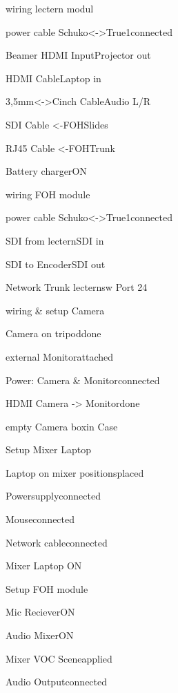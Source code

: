 \begin{checklist}{wiring lectern modul}
  \item{power cable Schuko<->True1}{connected}
  \item{Beamer HDMI Input}{Projector out}
  \item{HDMI Cable}{Laptop in}
  \item{3,5mm<->Cinch Cable}{Audio L/R}
  \item{SDI Cable <-FOH}{Slides}
  \item{RJ45 Cable <-FOH}{Trunk}
  \item{Battery charger}{ON}
\end{checklist}

\begin{checklist}{wiring FOH module}
  \item{power cable Schuko<->True1}{connected}
  \item{SDI from lectern}{SDI in}
  \item{SDI to Encoder}{SDI out}
  \item{Network Trunk lectern}{sw Port 24}
\end{checklist}

\begin{checklist}{wiring \& setup Camera}
  \item{Camera on tripod}{done}
  \item{external Monitor}{attached}
  \item{Power: Camera \& Monitor}{connected}
  \item{HDMI Camera -> Monitor}{done}
  \item{empty Camera box}{in Case}
\end{checklist}

\begin{checklist}{Setup Mixer Laptop}
  \item{Laptop on mixer positions}{placed}
  \item{Powersupply}{connected}
  \item{Mouse}{connected}
  \item{Network cable}{connected}
  \item{Mixer Laptop }{ON}
\end{checklist}

\begin{checklist}{Setup FOH module}
  \item{Mic Reciever}{ON}
  \item{Audio Mixer}{ON}
  \item{Mixer VOC Scene}{applied}
  \item{Audio Output}{connected}
\end{checklist}

